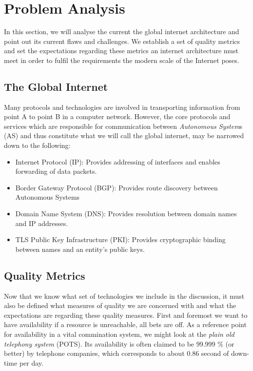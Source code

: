 \documentclass[../eva1_scion.tex]{subfiles}
\begin{document}
\section{Problem Analysis}\label{sec:analysis}
In this section, we will analyse the current  the global internet architecture and point out its current flaws and challenges. We establish a set of quality metrics and set the expectations regarding these metrics an internet architecture must meet in order to fulfil the requirements the modern scale of the Internet poses.

\subsection{The Global Internet}%
\label{ssec:the_global_internet}

Many protocols and technologies are involved in transporting information from point A to point B in a computer network. However, the core protocols and services which are responsible for communication between \textit{Autonomous System}s (AS)  and thus constitute what we will call the global internet, may be narrowed down to the following:

    \begin{itemize}
        \item Internet Protocol (IP): Provides addressing of interfaces and enables forwarding of data packets.
        \item Border Gateway Protocol (BGP): Provides route discovery between Autonomous Systems \cite{rfc_bgp}
        \item Domain Name System (DNS): Provides resolution between domain names and IP addresses.
        \item TLS Public Key Infrastructure (PKI): Provides cryptographic binding between names and an entity's public keys.
    \end{itemize}

\subsection{Quality Metrics}\label{ssec:quality_metrics}

Now that we know what set of technologies we include in the discussion, it must also be defined what measures of quality we are concerned with and what the expectations are regarding these quality measures. First and foremost we want to have availability  \textendash  if a resource is unreachable, all bets are off.  As a reference point for availability in a vital commination system, we might look at the \textit{plain old telephony system} (POTS). Its availability is often claimed to be 99.999 \% (or better) by telephone companies, which corresponds to about 0.86 second of down-time per day.
\end{document}
